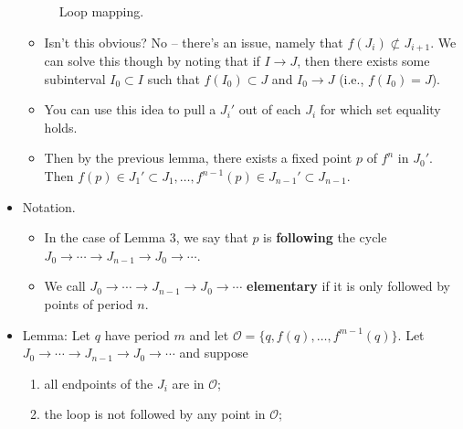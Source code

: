 \documentclass[../notes.tex]{subfiles}
\begin{document}
\begin{itemize}
\begin{figure}[h!]
        \caption{Loop mapping.}
        \label{fig:loopMapping}
    \end{figure}
    \begin{itemize}
        \item Isn't this obvious? No -- there's an issue, namely that $f(J_i)\not\subset J_{i+1}$. We can solve this though by noting that if $I\to J$, then there exists some subinterval $I_0\subset I$ such that $f(I_0)\subset J$ and $I_0\to J$ (i.e., $f(I_0)=J$).
        \item You can use this idea to pull a $J_i'$ out of each $J_i$ for which set equality holds.
        \item Then by the previous lemma, there exists a fixed point $p$ of $f^n$ in $J_0'$. Then $f(p)\in J_1'\subset J_1,\dots,f^{n-1}(p)\in J_{n-1}'\subset J_{n-1}$.
    \end{itemize}
    \item Notation.
    \begin{itemize}
        \item In the case of Lemma 3, we say that $p$ is \textbf{following} the cycle $J_0\to\cdots\to J_{n-1}\to J_0\to\cdots$.
        \item We call $J_0\to\cdots\to J_{n-1}\to J_0\to\cdots$ \textbf{elementary} if it is only followed by points of period $n$.
    \end{itemize}
    \item Lemma: Let $q$ have period $m$ and let $\mathcal{O}=\{q,f(q),\dots,f^{m-1}(q)\}$. Let $J_0\to\cdots\to J_{n-1}\to J_0\to\cdots$ and suppose
    \begin{enumerate}[label={(\roman*)}]
        \item all endpoints of the $J_i$ are in $\mathcal{O}$;
        \item the loop is not followed by any point in $\mathcal{O}$;

\end{enumerate}
\end{itemize}
\end{document}
